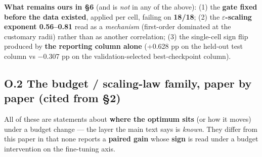 \documentclass[pdflatex,sn-mathphys-ay]{sn-jnl}
\begin{document}
\textbf{What remains ours in \S{}6} (and is \emph{not} in any of the above): (1) the \textbf{gate fixed before the data existed}, applied per cell, failing on \textbf{18/18}; (2) the \textbf{\ensuremath{\varepsilon}-scaling exponent 0.56--0.81} read as a \emph{mechanism} (first-order dominated at the customary radii) rather than as another correlation; (3) the single-cell sign flip produced by \textbf{the reporting column alone} (+0.628 pp on the held-out test column vs \ensuremath{-}0.307 pp on the validation-selected best-checkpoint column).

\subsection*{O.2 The budget / scaling-law family, paper by paper (cited from \S{}2)}

All of these are statements about \textbf{where the optimum sits} (or how it moves) under a budget change --- the layer the main text says is \emph{known}. They differ from this paper in that none reports a \textbf{paired gain} whose \textbf{sign} is read under a budget intervention on the fine-tuning axis.
\end{document}
